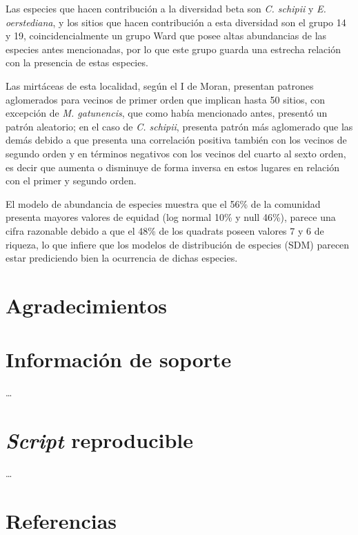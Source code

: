 \documentclass[11pt,]{article}
\begin{document}
Las especies que hacen contribución a la diversidad beta son \emph{C.
schipii} y \emph{E. oerstediana}, y los sitios que hacen contribución a
esta diversidad son el grupo 14 y 19, coincidencialmente un grupo Ward
que posee altas abundancias de las especies antes mencionadas, por lo
que este grupo guarda una estrecha relación con la presencia de estas
especies.

Las mirtáceas de esta localidad, según el I de Moran, presentan patrones
aglomerados para vecinos de primer orden que implican hasta 50 sitios,
con excepción de \emph{M. gatunencis}, que como había mencionado antes,
presentó un patrón aleatorio; en el caso de \emph{C. schipii}, presenta
patrón más aglomerado que las demás debido a que presenta una
correlación positiva también con los vecinos de segundo orden y en
términos negativos con los vecinos del cuarto al sexto orden, es decir
que aumenta o disminuye de forma inversa en estos lugares en relación
con el primer y segundo orden.

El modelo de abundancia de especies muestra que el 56\% de la comunidad
presenta mayores valores de equidad (log normal 10\% y null 46\%),
parece una cifra razonable debido a que el 48\% de los quadrats poseen
valores 7 y 6 de riqueza, lo que infiere que los modelos de distribución
de especies (SDM) parecen estar prediciendo bien la ocurrencia de dichas
especies.

\section{Agradecimientos}\label{agradecimientos}

\section{Información de soporte}\label{informaciuxf3n-de-soporte}

\ldots

\section{\texorpdfstring{\emph{Script}
reproducible}{Script reproducible}}\label{script-reproducible}

\ldots

\section*{Referencias}\label{referencias}
\end{document}
